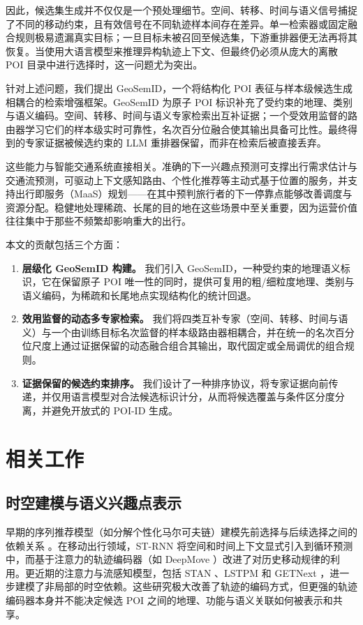 \documentclass[10pt,fontset=none,twocolumn]{ctexart}
\begin{document}
因此，候选集生成并不仅仅是一个预处理细节。空间、转移、时间与语义信号捕捉了不同的移动约束，且有效信号在不同轨迹样本间存在差异。单一检索器或固定融合规则极易遗漏真实目标；一旦目标未被召回至候选集，下游重排器便无法再将其恢复。当使用大语言模型来推理异构轨迹上下文、但最终仍必须从庞大的离散 POI 目录中进行选择时，这一问题尤为突出。

针对上述问题，我们提出 GeoSemID，一个将结构化 POI 表征与样本级候选生成相耦合的检索增强框架。GeoSemID 为原子 POI 标识补充了受约束的地理、类别与语义编码。空间、转移、时间与语义专家检索出互补证据；一个受效用监督的路由器学习它们的样本级实时可靠性，名次百分位融合使其输出具备可比性。最终得到的专家证据被候选约束的 LLM 重排器保留，而非在检索后被直接丢弃。

这些能力与智能交通系统直接相关。准确的下一兴趣点预测可支撑出行需求估计与交通流预测，可驱动上下文感知路由、个性化推荐等主动式基于位置的服务，并支持出行即服务（MaaS）规划——在其中预判旅行者的下一停靠点能够改善调度与资源分配。稳健地处理稀疏、长尾的目的地在这些场景中至关重要，因为运营价值往往集中于那些不频繁却影响重大的出行。

本文的贡献包括三个方面：
\begin{enumerate}[leftmargin=*]
\item \textbf{层级化 GeoSemID 构建。} 我们引入 GeoSemID，一种受约束的地理语义标识，它在保留原子 POI 唯一性的同时，提供可复用的粗/细粒度地理、类别与语义编码，为稀疏和长尾地点实现结构化的统计回退。
\item \textbf{效用监督的动态多专家检索。} 我们将四类互补专家（空间、转移、时间与语义）与一个由训练目标名次监督的样本级路由器相耦合，并在统一的名次百分位尺度上通过证据保留的动态融合组合其输出，取代固定或全局调优的组合规则。
\item \textbf{证据保留的候选约束排序。} 我们设计了一种排序协议，将专家证据向前传递，并仅用语言模型对合法候选标识计分，从而将候选覆盖与条件区分度分离，并避免开放式的 POI-ID 生成。
\end{enumerate}

\section{相关工作}
\label{sec:related_work}

\subsection{时空建模与语义兴趣点表示}
\label{subsec:rw_representation}

早期的序列推荐模型（如分解个性化马尔可夫链）建模先前选择与后续选择之间的依赖关系 \cite{rendle2010}。在移动出行领域，ST-RNN \cite{liu2016} 将空间和时间上下文显式引入到循环预测中，而基于注意力的轨迹编码器（如 DeepMove \cite{feng2018}）改进了对历史移动规律的利用。更近期的注意力与流感知模型，包括 STAN \cite{luo2021stan}、LSTPM \cite{sun2020lstpm} 和 GETNext \cite{yang2022}，进一步建模了非局部的时空依赖。这些研究极大改善了轨迹的编码方式，但更强的轨迹编码器本身并不能决定候选 POI 之间的地理、功能与语义关联如何被表示和共享。
\end{document}
